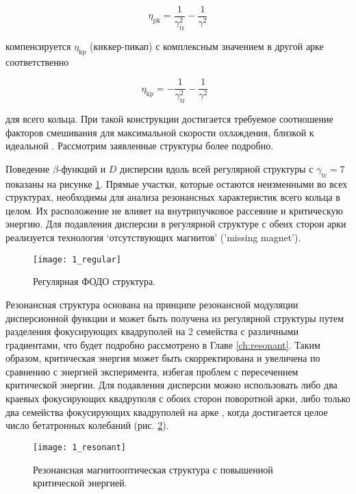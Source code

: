 \begin{equation} \label{eq:eta_pk}
\eta_{\textrm{pk}}=\frac{1}{\gamma_{\textrm{tr}}^2}-\frac{1}{\gamma^2}
\end{equation}

\noindent компенсируется $\eta_{\textrm{kp}}$ (киккер-пикап) с комплексным значением в другой арке соответственно

\begin{equation} \label{eq:eta_kp}
\eta_{\textrm{kp}}=-\frac{1}{\gamma_{\textrm{tr}}^2}-\frac{1}{\gamma^2}\ \ \ 
\end{equation}

\noindent для всего кольца. При такой конструкции достигается требуемое соотношение факторов смешивания для максимальной скорости охлаждения, близкой к идеальной \cite{senichev:hesr}. Рассмотрим заявленные структуры более подробно.

\par Поведение $\beta$-функций и $D$ дисперсии вдоль всей регулярной структуры с $\gamma_{\text{tr}}=7$ показаны на рисунке \ref{fig:1_regular}. Прямые участки, которые остаются неизменными во всех структурах, необходимы для анализа резонансных характеристик всего кольца в целом. Их расположение не влияет на внутрипучковое рассеяние и критическую энергию. Для подавления дисперсии в регулярной структуре с обеих сторон арки реализуется технология ‘отсутствующих магнитов’ ('missing magnet').

\begin{figure}[!h]
  \centering
   \texttt{[image: 1\_regular]}
   \caption{Регулярная ФОДО структура.}
   \label{fig:1_regular}
\end{figure}

\noindent Резонансная структура основана на принципе резонансной модуляции дисперсионной функции \cite{senichev:construction} и может быть получена из регулярной структуры путем разделения фокусирующих квадруполей на 2 семейства с различными градиентами, что будет подробно рассмотрено в Главе \ref{ch:resonant}. Таким образом, критическая энергия может быть скорректирована и увеличена по сравнению с энергией эксперимента, избегая проблем с пересечением критической энергии. Для подавления дисперсии можно использовать либо два краевых фокусирующих квадруполя с обоих сторон поворотной арки, либо только два семейства фокусирующих квадруполей на арке \cite{Kolokolchikov:2021trans}, когда достигается целое число бетатронных колебаний (рис. \ref{fig:1_resonant}).

\begin{figure}[!h]
  \centering
   \texttt{[image: 1\_resonant]}
   \caption{Резонансная магнитооптическая структура с повышенной критической энергией.}
   \label{fig:1_resonant}
\end{figure}

